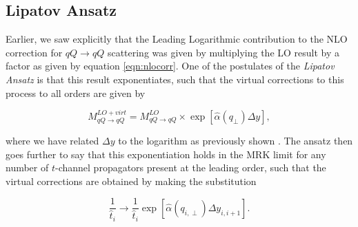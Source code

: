 \subsection{Lipatov Ansatz}
Earlier, we saw explicitly that the Leading Logarithmic contribution to the NLO correction for $qQ \to qQ$ scattering was given by multiplying the LO result by a factor as given by equation \ref{eqn:nlocorr}. One of the postulates of the \emph{Lipatov Ansatz} is that this result exponentiates, such that the virtual corrections to this process to all orders are given by

\begin{equation}
M_{qQ \to qQ}^{LO + virt} = M_{qQ \to qQ}^{LO} \times \exp \left[\hat{\alpha}(q_\perp) \Delta y \right],
\end{equation}

where we have related $\Delta y$ to the logarithm as previously shown . The ansatz then goes further to say that this exponentiation holds in the MRK limit for any number of $t$-channel propagators present at the leading order, such that the virtual corrections are obtained by making the substitution

\begin{equation}
\frac{1}{\hat{t}_i} \to \frac{1}{\hat{t}_i} \exp \left[\hat{\alpha}(q_{i,\perp}) \Delta y_{i,i+1} \right].
\end{equation}


